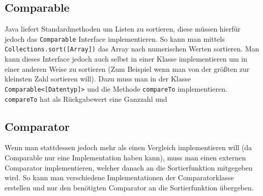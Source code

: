 \documentclass{article}
\begin{document}
	\subsection{Comparable}
	Java liefert Standardmethoden um Listen zu sortieren, diese müssen hierfür jedoch das \texttt{Comparable} Interface implementieren. So kann man mittels \texttt{Collections.sort([Array])} das Array nach numerischen Werten sortieren. Man kann dieses Interface jedoch auch selbst in einer Klasse implementieren um in einer anderen Weise zu sortieren (Zum Beispiel wenn man von der größten zur kleinsten Zahl sortieren will). Dazu muss man in der Klasse \texttt{Comparable<[Datentyp]>} und die Methode \texttt{compareTo} implementieren. \texttt{compareTo} hat als Rückgabewert eine Ganzzahl und
	\subsection{Comparator}
	Wenn man stattdessen jedoch mehr als einen Vergleich implementieren will (da Comparable nur eine Implementation haben kann), muss man einen externen Comparator implementieren, welcher danach an die Sortierfunktion mitgegeben wird. So kann man verschiedene Implementationen der Comparatorklasse erstellen und nur den benötigten Comparator an die Sortierfunktion übergeben.
\end{document}
